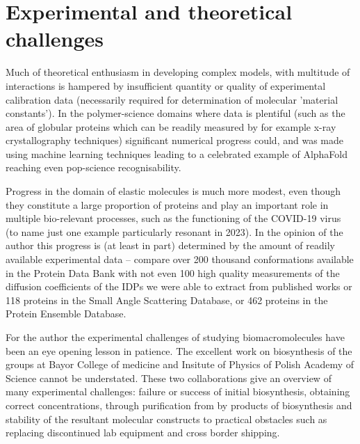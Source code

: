 \documentclass{doctoral}
\begin{document}
\section{Experimental and theoretical challenges}
Much of theoretical enthusiasm in developing complex models, with multitude of interactions is hampered by insufficient quantity or quality of experimental calibration data (necessarily required for determination of molecular 'material constants'). 
In the polymer-science domains where data is plentiful (such as the area of globular proteins which can be readily measured by for example x-ray crystallography techniques) significant numerical progress could, and was made using machine learning techniques leading to a celebrated example of AlphaFold \cite{Jumper_2021} reaching even pop-science recognisability.

Progress in the domain of elastic molecules is much more modest, even though they constitute a large proportion of proteins\cite{Ward_2004} and play an important role in multiple bio-relevant processes, such as the functioning of the COVID-19 virus\cite{Rozycki_2022} (to name just one example particularly resonant in 2023).
In the opinion of the author this progress is (at least in part) determined by the amount of readily available experimental data -- compare over 200 thousand conformations available in the Protein Data Bank\cite{rcsb_org} with not even 100 high quality measurements of the diffusion coefficients of the IDPs we were able to extract from published works\cite{Waszkiewicz_2024_mda} 
or 118 proteins in the Small Angle Scattering Database\cite{sasdb_org},
or 462 proteins in the Protein Ensemble Database\cite{proteinensemble_org}.

For the author the experimental challenges of studying biomacromolecules have been an eye opening lesson in patience. The excellent work on biosynthesis of the groups at Bayor College of medicine and Insitute of Physics of Polish Academy of Science cannot be understated. These two collaborations give an overview of many experimental challenges: failure or success of initial biosynthesis, obtaining correct concentrations, through purification from by products of biosynthesis and  stability of the resultant molecular constructs to practical obstacles such as replacing discontinued lab equipment and cross border shipping.
\end{document}
